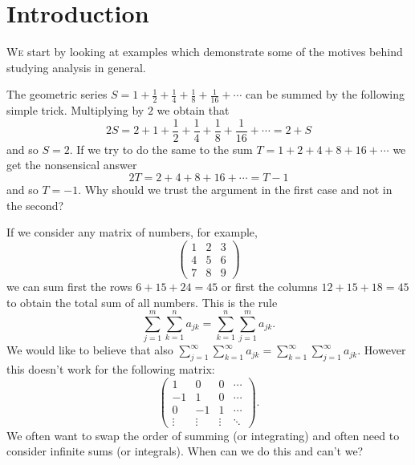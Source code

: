 \chapter{Introduction}

\lettrine{W}{e} start by looking at examples which demonstrate some of the motives behind studying analysis in general.
%
\begin{example*}[Series]
  The geometric series
  \(S = 1 + \frac{1}{2} + \frac{1}{4} + \frac{1}{8} + \frac{1}{16} + \cdots\)
  can be summed by the following simple trick.
  Multiplying by \(2\) we obtain that
  \[
    2S = 2 + 1 + \frac{1}{2} + \frac{1}{4} + \frac{1}{8} + \frac{1}{16} + \cdots = 2+S
  \]
  and so \(S=2\).
  If we try to do the same to the sum
  \(T = 1 + 2 + 4 + 8 + 16 + \cdots\)
  we get the nonsensical answer
  \[
    2T = 2 + 4 + 8 + 16 + \cdots = T -1
  \]
  and so \(T = -1\).
  Why should we trust the argument in the first case and not in the second?
\end{example*}


\begin{example*}
  If we consider any matrix of numbers, for example,
  \[
    \begin{pmatrix}
      1 & 2 & 3 \\
      4 & 5 & 6 \\
      7 & 8 & 9
    \end{pmatrix}
  \]
  we can sum first the rows \(6 + 15 + 24 = 45\) or first the columns \(12 + 15 + 18 = 45\) to obtain the total sum of all numbers.
  This is the rule
  \[
    \sum_{j=1}^{m} \sum_{k=1}^{n} a_{jk} = \sum_{k=1}^{n} \sum_{j=1}^{m}  a_{jk}.
  \]
  We would like to believe that also \(\sum_{j=1}^{\infty} \sum_{k=1}^{\infty} a_{jk} = \sum_{k=1}^{\infty} \sum_{j=1}^{\infty}  a_{jk}\).
  However this doesn't work for the following matrix:
  \[
    \begin{pmatrix}
      1      & 0      & 0      & \cdots \\
      -1     & 1      & 0      & \cdots \\
      0      & -1     & 1      & \cdots \\
      \vdots & \vdots & \vdots & \ddots
    \end{pmatrix}.
  \]
  We often want to swap the order of summing (or integrating) and often need to consider infinite sums (or integrals).
  When can we do this and can't we?
\end{example*}

